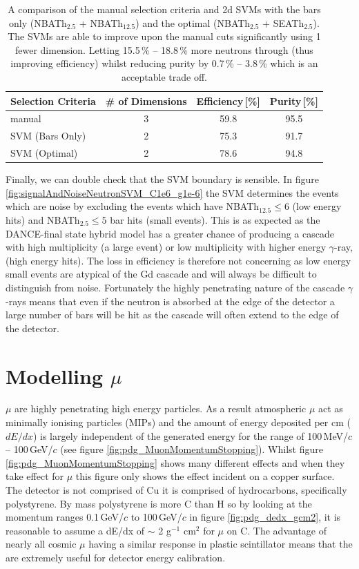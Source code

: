 \begin{table}[!h]
\centering
\begin{tabular}{lccc}  
\toprule
Selection Criteria & \# of Dimensions & Efficiency\,[\%] & Purity\,[\%] \\
\midrule
manual            & 3                & 59.8             & 95.5         \\
SVM (Bars Only)    & 2                & 75.3             & 91.7         \\
SVM (Optimal)      & 2                & 78.6             & 94.8         \\
\bottomrule  
\end{tabular}
\caption{A comparison of the manual selection criteria and 2d SVMs with the bars only (NBATh$_{2.5}$ + NBATh$_{12.5}$) and the optimal (NBATh$_{2.5}$ + SEATh$_{2.5}$). The SVMs are able to improve upon the manual cuts significantly using 1 fewer dimension. Letting 15.5\,\% -- 18.8\,\% more neutrons through (thus improving efficiency) whilst reducing purity by 0.7\,\% -- 3.8\,\% which is an acceptable trade off.}
\label{tab:svmSelection}
\end{table}

Finally, we can double check that the SVM boundary is sensible. In figure \ref{fig:signalAndNoiseNeutronSVM_C1e6_g1e-6} the SVM determines the events which are noise by excluding the events which have NBATh$_{12.5}\leq 6$ (low energy hits) and NBATh$_2.5 \leq 5$ bar hits (small events). This is as expected as the DANCE-final state hybrid model has a greater chance of producing a cascade with high multiplicity (a large event) or low multiplicity with higher energy $\gamma$-ray, (high energy hits). The loss in efficiency is therefore not concerning as low energy small events are atypical of the Gd cascade and will always be difficult to distinguish from noise. Fortunately the highly penetrating nature of the cascade $\gamma$-rays means that even if the neutron is absorbed at the edge of the detector a large number of bars will be hit as the cascade will often extend to the edge of the detector. 

\clearpage
\section{Modelling $\mu$}
$\mu$ are highly penetrating high energy particles. As a result atmospheric $\mu$ act as minimally ionising particles (MIPs) and the amount of energy deposited per cm ($dE/dx$) is largely independent of the generated energy for the range of 100\,MeV/$c$ -- 100\,GeV/$c$ (see figure \ref{fig:pdg_MuonMomentumStopping}). Whilst figure \ref{fig:pdg_MuonMomentumStopping} shows many different effects and when they take effect for $\mu$ this figure only shows the effect incident on a copper surface. The detector is not comprised of Cu it is comprised of hydrocarbons, specifically polystyrene. By mass polystyrene is more C than H so by looking at the momentum ranges 0.1\,GeV/$c$ to 100\,GeV/$c$ in figure \ref{fig:pdg_dedx_gcm2}, it is reasonable to assume a dE/dx of $\sim$ 2 g$^{-1}$ cm$^2$ for $\mu$ on C. The advantage of nearly all cosmic $\mu$ having a similar response in plastic scintillator means that the are extremely useful for detector energy calibration. 

